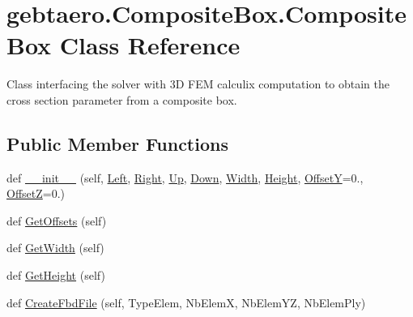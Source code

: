 \hypertarget{classgebtaero_1_1_composite_box_1_1_composite_box}{}\section{gebtaero.\+Composite\+Box.\+Composite\+Box Class Reference}
\label{classgebtaero_1_1_composite_box_1_1_composite_box}


Class interfacing the solver with 3D F\+EM calculix computation to obtain the cross section parameter from a composite box.  


\subsection*{Public Member Functions}
\begin{DoxyCompactItemize}
\item 
def \hyperlink{classgebtaero_1_1_composite_box_1_1_composite_box_a64c4292dbd036313813fc00a78fb13cb}{\+\_\+\+\_\+init\+\_\+\+\_\+} (self, \hyperlink{classgebtaero_1_1_composite_box_1_1_composite_box_a7bfe2dab84e5ae8d8cdba1337b89c309}{Left}, \hyperlink{classgebtaero_1_1_composite_box_1_1_composite_box_a61cdca93cc1f5ef451192395fc50b67b}{Right}, \hyperlink{classgebtaero_1_1_composite_box_1_1_composite_box_a4c043150a29d71b986a91f21be6a4e47}{Up}, \hyperlink{classgebtaero_1_1_composite_box_1_1_composite_box_ad1559917cabe3fcb6c05bf603d8b0b0c}{Down}, \hyperlink{classgebtaero_1_1_composite_box_1_1_composite_box_a44593d7302ceb1c46ac637437b5e1061}{Width}, \hyperlink{classgebtaero_1_1_composite_box_1_1_composite_box_affc2b38183c3b0ec7534629cf63e4cc5}{Height}, \hyperlink{classgebtaero_1_1_composite_box_1_1_composite_box_a26fcf7763030afb28f45f2354125c352}{OffsetY}=0., \hyperlink{classgebtaero_1_1_composite_box_1_1_composite_box_a50e38078e66133a95f34f2d9176329d9}{OffsetZ}=0.)
\item 
def \hyperlink{classgebtaero_1_1_composite_box_1_1_composite_box_a80477ea79acc12d0d45970d6c0b208d6}{Get\+Offsets} (self)
\item 
def \hyperlink{classgebtaero_1_1_composite_box_1_1_composite_box_a227089b18b5436fdba7853cbe1071a99}{Get\+Width} (self)
\item 
def \hyperlink{classgebtaero_1_1_composite_box_1_1_composite_box_a8ca332752a2b78ca0ba4c65f99ab1b62}{Get\+Height} (self)
\item 
def \hyperlink{classgebtaero_1_1_composite_box_1_1_composite_box_af2465d364bb51056af14fde13bd05d4a}{Create\+Fbd\+File} (self, Type\+Elem, Nb\+ElemX, Nb\+Elem\+YZ, Nb\+Elem\+Ply)

\end{DoxyCompactItemize}
